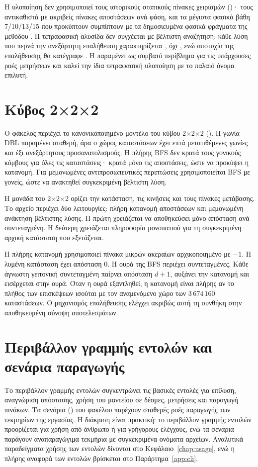 Η υλοποίηση δεν χρησιμοποιεί τους ιστορικούς στατικούς πίνακες χειρισμών ()· τους αντικαθιστά με ακριβείς πίνακες αποστάσεων ανά φάση, και τα μέγιστα φασικά βάθη 7/10/13/15 που προκύπτουν συμπίπτουν με τα δημοσιευμένα φασικά φράγματα της μεθόδου \cite{scherphuisThistlethwaite}. Η τετραφασική αλυσίδα δεν συγχέεται με βέλτιστη αναζήτηση: κάθε λύση που περνά την ανεξάρτητη επαλήθευση χαρακτηρίζεται , όχι , ενώ αποτυχία της επαλήθευσης θα κατέγραφε . Η  παραμένει ως συμβατό περίβλημα για τις υπάρχουσες ροές μετρήσεων και καλεί την ίδια τετραφασική υλοποίηση με το παλαιό όνομα επιλυτή.

\section{Κύβος 2×2×2}
\label{sec:implementation-pocket}
Ο φάκελος  περιέχει το κανονικοποιημένο μοντέλο του κύβου 2×2×2 (). Η γωνία DBL παραμένει σταθερή, άρα ο χώρος καταστάσεων έχει επτά μετατιθέμενες γωνίες και έξι ανεξάρτητους προσανατολισμούς. Η πλήρης BFS δεν κρατά τους γονικούς κόμβους για όλες τις καταστάσεις· κρατά μόνο τις αποστάσεις, ώστε να προκύψει η κατανομή. Για μεμονωμένες αντιπροσωπευτικές περιπτώσεις χρησιμοποιείται BFS με γονείς, ώστε να ανακτηθεί συγκεκριμένη βέλτιστη λύση.

Η μονάδα του 2×2×2 ορίζει την κατάσταση, τις κινήσεις και τους πίνακες μετάβασης. Το αρχείο  περιέχει δύο λειτουργίες: πλήρη κατανομή αποστάσεων και μεμονωμένη ανάκτηση βέλτιστης λύσης. Η πρώτη χρειάζεται να αποθηκεύσει μόνο απόσταση ανά συντεταγμένη. Η δεύτερη χρειάζεται πληροφορία μονοπατιού για τη συγκεκριμένη αρχική κατάσταση που εξετάζεται.

Η πλήρης κατανομή χρησιμοποιεί πίνακα μικρών ακεραίων αρχικοποιημένο με \(-1\). Η λυμένη κατάσταση έχει απόσταση 0. Η ουρά της BFS περιέχει συντεταγμένες. Κάθε άγνωστη γειτονική συντεταγμένη παίρνει απόσταση \(d+1\), αυξάνει την κατανομή και εισέρχεται στην ουρά. Όταν η ουρά εξαντληθεί, η κατανομή είναι πλήρης αν το πλήθος των επισκέψεων ισούται με τον αναμενόμενο χώρο των \(3\,674\,160\) καταστάσεων. Ο μηχανισμός επαλήθευσης ελέγχει ακριβώς αυτή τη συνθήκη στην αποθηκευμένη σύνοψη αποτελεσμάτων.

\section{Περιβάλλον γραμμής εντολών και σενάρια παραγωγής}
\label{sec:implementation-cli}
Το περιβάλλον γραμμής εντολών συγκεντρώνει τις βασικές εντολές για επίλυση, αναγνώριση απόστασης, χρήση του μαντείου σε δέσμες, μετρήσεις και παραγωγή πινάκων. Τα σενάρια () του φακέλου  παρέχουν σταθερές ροές παραγωγής των τεκμηρίων της εργασίας. Η διάκριση είναι πρακτική: το περιβάλλον γραμμής εντολών προορίζεται για χρήση από άνθρωπο ή για γρήγορους ελέγχους, ενώ τα σενάρια παράγουν αναπαραγώγιμα τεκμήρια με συγκεκριμένα ονόματα αρχείων. Αναλυτικά παραδείγματα χρήσης των εντολών δίνονται στο Κεφάλαιο~\ref{chap:usage}, ενώ η πλήρης αναφορά των εντολών βρίσκεται στο Παράρτημα~\ref{app:cli}.

